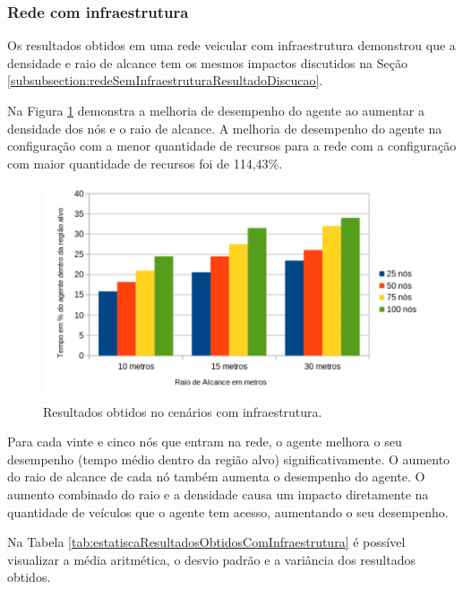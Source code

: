 \subsubsection{Rede com infraestrutura}

	Os resultados obtidos em uma rede veicular com infraestrutura demonstrou que a densidade e raio de alcance tem os mesmos impactos discutidos na Seção \ref{subsubsection:redeSemInfraestruturaResultadoDiscucao}.

	Na Figura \ref{fig:graficosComTorres} demonstra a melhoria de desempenho do agente ao aumentar a densidade dos nós e o raio de alcance. A melhoria de desempenho do agente na configuração com a menor quantidade de recursos para a rede com a configuração com maior quantidade de recursos foi de 114,43\%.   
 

	\begin{figure}[htbp]
		\centering
		\includegraphics[scale=0.5]{resultados/graficos/graficoComTorres.pdf}
		\caption{Resultados obtidos no cenários com infraestrutura.}
		\label{fig:graficosComTorres}
	\end{figure}

	Para cada vinte e cinco nós que entram na rede, o agente melhora o seu desempenho (tempo médio dentro da região alvo) significativamente. O aumento do raio de alcance de cada nó também aumenta o desempenho do agente. O aumento combinado do raio e a densidade causa um impacto diretamente na quantidade de veículos que o agente tem acesso, aumentando o seu desempenho.

	Na Tabela \ref{tab:estatiscaResultadosObtidosComInfraestrutura} é possível visualizar a média aritmética, o desvio padrão e a variância dos resultados obtidos.

